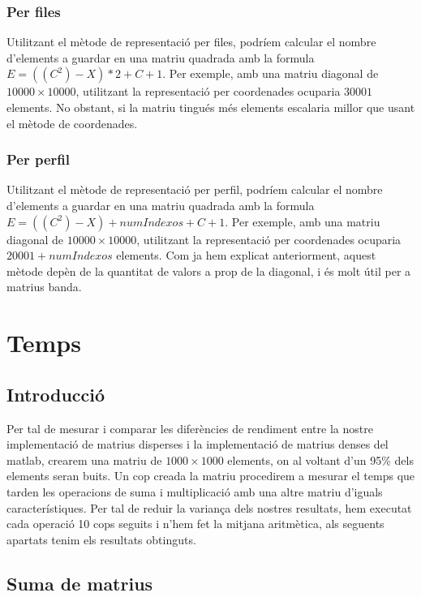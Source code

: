 \documentclass[11pt,a4paper,twoside]{report}
\begin{document}
\subsubsection{Per files}

Utilitzant el mètode de representació per files, podríem calcular el nombre d'elements a guardar en una matriu quadrada  amb la formula $E=((C^2)-X)*2+C+1$.
Per exemple, amb una matriu diagonal de $10000 \times 10000$, utilitzant la representació per coordenades ocuparia $30001$ elements. No obstant, si la matriu tingués més elements
escalaria millor que usant el mètode de coordenades.

\subsubsection{Per perfil}

Utilitzant el mètode de representació per perfil, podríem calcular el nombre d'elements a guardar en una matriu quadrada  amb la formula $E=((C^2)-X)+numIndexos+C+1$.
Per exemple, amb una matriu diagonal de $10000 \times 10000$, utilitzant la representació per coordenades ocuparia $20001+numIndexos$ elements. Com ja hem explicat anteriorment, aquest mètode depèn de la quantitat de valors a prop de la diagonal, i és molt útil per a matrius banda.

\section{Temps}

\subsection{Introducció}

Per tal de mesurar i comparar les diferències de rendiment entre la nostre implementació de matrius disperses i la implementació de matrius denses del matlab, crearem una matriu de $1000 \times 1000$ elements,
on al voltant d'un 95\% dels elements seran buits. Un cop creada la matriu procedirem a mesurar el temps que tarden les operacions de suma i multiplicació amb una altre matriu d'iguals característiques. 
Per tal de reduir la variança dels nostres resultats, hem executat cada operació 10 cops seguits i n'hem fet la mitjana aritmètica, als seguents apartats tenim els resultats obtinguts.
\subsection{Suma de matrius}
\end{document}

